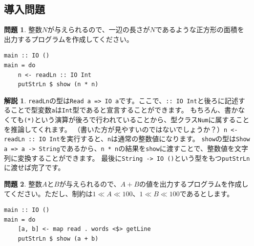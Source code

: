 \documentclass[12pt,a4paper,dvipdfmx,fleqn]{article}%
\theoremstyle{definition}
\newtheorem*{toi*}{問題}
\theoremstyle{definition}
\newtheorem*{ans*}{解説}
\theoremstyle{definition}
\newcommand{\ttt}[1]{\texttt{#1}} %
\begin{document}
\subsection{導入問題}\label{導入問題}
\begin{toi*}
    整数$N$が与えられるので、一辺の長さが$N$であるような正方形の面積を出力するプログラムを作成してください。
\end{toi*}
\begin{lstlisting}[caption=A01.hs,label=A01]
main :: IO ()
main = do
    n <- readLn :: IO Int
    putStrLn $ show (n * n)
\end{lstlisting}
\begin{ans*}
    \ttt{readLn}の型は\ttt{Read a => IO a}です。ここで、\ttt{:: IO Int}と後ろに記述することで型変数\ttt{a}は\ttt{Int}型であると宣言することができます。
    もちろん、書かなくても\ttt{(*)}という演算が後ろで行われていることから、型クラス\ttt{Num}に属することを推論してくれます。
    （書いた方が見やすいのではないでしょうか？）\ttt{n <- readLn :: IO Int}を実行すると、\ttt{n}は通常の整数値になります。
    \ttt{show}の型は\ttt{Show a => a -> String}であるから、\ttt{n * n}の結果を\ttt{show}に渡すことで、整数値を文字列に変換することができます。
    最後に\ttt{String -> IO ()}という型をもつ\ttt{putStrLn}に渡せば完了です。
\end{ans*}
\begin{toi*}
    整数$A$と$B$が与えられるので、$A+B$の値を出力するプログラムを作成してください。ただし、制約は$1\ll A\ll 100$、$1\ll B\ll 100$であるとします。
\end{toi*}
\begin{lstlisting}[caption=B01.hs,label=B01]
main :: IO ()
main = do
    [a, b] <- map read . words <$> getLine
    putStrLn $ show (a + b)
\end{lstlisting}
\end{document}
